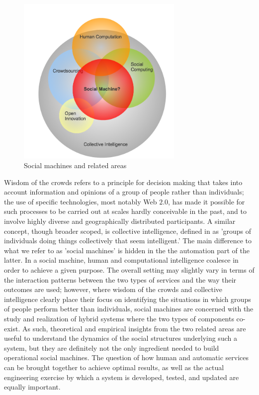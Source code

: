 \documentclass{sig-alternate}
\begin{document}
\begin{figure}[htb]
\begin{center}
\includegraphics[width=8cm]{img/socialmachinescope.png}
\caption{Social machines and related areas} \label{fig:social machine}
\end{center}
\end{figure}

Wisdom of the crowds \cite{surowiecki2005wisdom} refers to a principle for decision making that takes into account information and opinions of a group of people rather than individuals; the use of specific technologies, most notably Web $2.0$, has made it possible for such processes to be carried out at scales hardly conceivable in the past, and to involve highly diverse and geographically distributed participants. A similar concept, though broader scoped, is collective intelligence, defined in  \cite{malone2009harnessing} as 'groups of individuals doing things collectively that seem intelligent.' The main difference to what we refer to as 'social machines' is hidden in the the automation part of the latter. In a social machine, human and computational intelligence coalesce in order to achieve a given purpose. The overall setting may slightly vary in terms of the interaction patterns between the two types of services and the way their outcomes are used; however, where wisdom of the crowds and collective intelligence clearly place their focus on identifying the situations in which groups of people perform better than individuals, social machines are concerned with the study and realization of hybrid systems where the two types of components co-exist. As such, theoretical and empirical insights from the two related areas are useful to understand the dynamics of the social structures underlying such a system, but they are definitely not the only ingredient needed to build operational social machines. The question of how human and automatic services can be brought together to achieve optimal results, as well as the actual engineering exercise by which a system is developed, tested, and updated are equally important.
\end{document}
